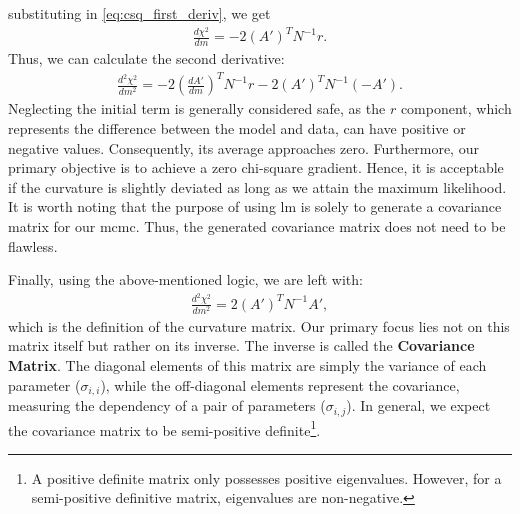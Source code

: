 \documentclass[12pt, TexShade, letterpaper]{report}
\begin{document}
substituting in \ref{eq:csq_first_deriv}, we get
\begin{align}
    \frac{d \chi^2}{dm} = -2 \left(A'\right)^T N^{-1} r.
\end{align}
Thus, we can calculate the second derivative:
\begin{align}
    \frac{d^2 \chi^2}{dm^2} = -2 \left(\frac{dA'}{dm}\right)^T N^{-1} r -2 \left(A'\right) ^T N^{-1} \left(-A'\right).
\end{align}
Neglecting the initial term is generally considered safe, as the $r$ component, which represents the difference between the model and data, can have positive or negative values. Consequently, its average approaches zero. Furthermore, our primary objective is to achieve a zero chi-square gradient. Hence, it is acceptable if the curvature is slightly deviated as long as we attain the maximum likelihood. It is worth noting that the purpose of using \gls{lm} is solely to generate a covariance matrix for our \gls{mcmc}. Thus, the generated covariance matrix does not need to be flawless.

Finally, using the above-mentioned logic, we are left with:
\begin{align}
         \frac{d^2 \chi^2}{dm^2} = 2 \left(A'\right)^T N^{-1} A' ,\label{eq:csq_second_deriv}
\end{align}
which is the definition of the curvature matrix. Our primary focus lies not on this matrix itself but rather on its inverse. The inverse is called the \textbf{Covariance Matrix}. The diagonal elements of this matrix are simply the variance of each parameter ($\sigma_{i, i}$), while the off-diagonal elements represent the covariance, measuring the dependency of a pair of parameters ($\sigma_{i, j}$). In general, we expect the covariance matrix to be semi-positive definite\footnote{A positive definite matrix only possesses positive eigenvalues. However, for a semi-positive definitive matrix, eigenvalues are non-negative.}.\par
\end{document}
